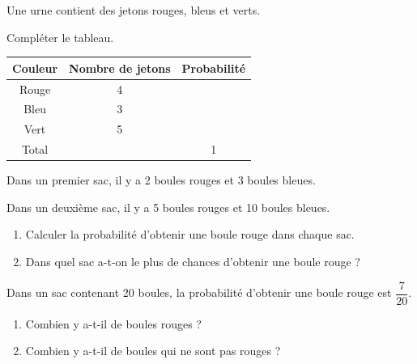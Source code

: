 \documentclass[11pt]{article}
\begin{document}
\newpage


\begin{exercice}

Une urne contient des jetons rouges, bleus et verts.

Compléter le tableau.

\begin{center}
\begin{tabular}{|c|c|c|}
\hline
Couleur & Nombre de jetons & Probabilité \\
\hline
Rouge & 4 & \\
\hline
Bleu & 3 & \\
\hline
Vert & 5 & \\
\hline
Total & & 1 \\
\hline
\end{tabular}
\end{center}

\end{exercice}


\begin{exercice}

Dans un premier sac, il y a 2 boules rouges et 3 boules bleues.

Dans un deuxième sac, il y a 5 boules rouges et 10 boules bleues.

\begin{enumerate}
    \item Calculer la probabilité d'obtenir une boule rouge dans chaque sac.
    \item Dans quel sac a-t-on le plus de chances d'obtenir une boule rouge ?
\end{enumerate}

\end{exercice}


\begin{exercice}

Dans un sac contenant 20 boules, la probabilité d'obtenir une boule rouge est $\dfrac{7}{20}$.

\begin{enumerate}
    \item Combien y a-t-il de boules rouges ?
    \item Combien y a-t-il de boules qui ne sont pas rouges ?
\end{enumerate}

\end{exercice}
\end{document}
